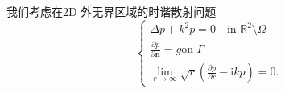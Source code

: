 \documentclass{article}
\begin{document}
\begin{CJK*}{UTF8}{gbsn}
我们考虑在2D 外无界区域的时谐散射问题
\[ \left\{ \begin{array}{l}
     \Delta p + k^2 p = 0 \quad \text{in } \mathbb{R}^2 \setminus \Omega\\
     \frac{\partial p}{\partial \mathbf{n}} = g \text{on } \Gamma\\
     \lim_{r \rightarrow \infty}  \sqrt{r}  \left( \frac{\partial p}{\partial
     r} - \mathrm{i} kp \right) = 0.
   \end{array} \right. \]


\end{CJK*}
\end{document}
